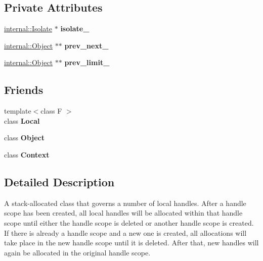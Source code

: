 \subsection*{Private Attributes}
\begin{DoxyCompactItemize}
\item 
\hyperlink{classv8_1_1internal_1_1_isolate}{internal\+::\+Isolate} $\ast$ {\bfseries isolate\+\_\+}\hypertarget{classv8_1_1_handle_scope_a57195a6d30243f34c50b4293003cd242}{}\label{classv8_1_1_handle_scope_a57195a6d30243f34c50b4293003cd242}

\item 
\hyperlink{classv8_1_1internal_1_1_object}{internal\+::\+Object} $\ast$$\ast$ {\bfseries prev\+\_\+next\+\_\+}\hypertarget{classv8_1_1_handle_scope_a739728a1286a7d92aaeb941db593fa1d}{}\label{classv8_1_1_handle_scope_a739728a1286a7d92aaeb941db593fa1d}

\item 
\hyperlink{classv8_1_1internal_1_1_object}{internal\+::\+Object} $\ast$$\ast$ {\bfseries prev\+\_\+limit\+\_\+}\hypertarget{classv8_1_1_handle_scope_a8c56251528a986904e67f28b36900bd9}{}\label{classv8_1_1_handle_scope_a8c56251528a986904e67f28b36900bd9}

\end{DoxyCompactItemize}
\subsection*{Friends}
\begin{DoxyCompactItemize}
\item 
{\footnotesize template$<$class F $>$ }\\class {\bfseries Local}\hypertarget{classv8_1_1_handle_scope_afb872edb4aac7ba55f0da004113aa2b0}{}\label{classv8_1_1_handle_scope_afb872edb4aac7ba55f0da004113aa2b0}

\item 
class {\bfseries Object}\hypertarget{classv8_1_1_handle_scope_a0720b5f434e636e22a3ed34f847eec57}{}\label{classv8_1_1_handle_scope_a0720b5f434e636e22a3ed34f847eec57}

\item 
class {\bfseries Context}\hypertarget{classv8_1_1_handle_scope_ac26c806e60ca4a0547680edb68f6e39b}{}\label{classv8_1_1_handle_scope_ac26c806e60ca4a0547680edb68f6e39b}

\end{DoxyCompactItemize}


\subsection{Detailed Description}
A stack-\/allocated class that governs a number of local handles. After a handle scope has been created, all local handles will be allocated within that handle scope until either the handle scope is deleted or another handle scope is created. If there is already a handle scope and a new one is created, all allocations will take place in the new handle scope until it is deleted. After that, new handles will again be allocated in the original handle scope.

